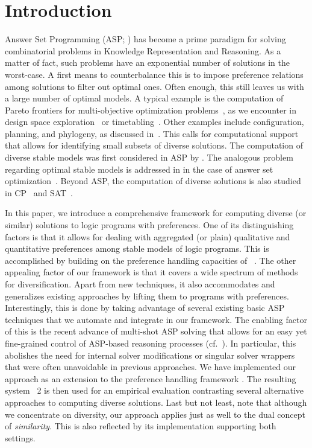 
\section{Introduction}\label{sec:introduction}
 
Answer Set Programming (ASP; \cite{baral02a}) has become a prime paradigm for solving combinatorial problems in Knowledge Representation and Reasoning. 
As a matter of fact,
such problems have an exponential number of solutions in the worst-case.
A first means to counterbalance this is to impose preference relations among solutions
to filter out optimal ones.
Often enough, this still leaves us with a large number of optimal models.
%
A typical example is the computation of Pareto frontiers for multi-objective optimization problems~\cite{pareto64a},
as we encounter in design space exploration~\cite{angeglharesc13a} or timetabling~\cite{basotainsc13a}.
%
Other examples include configuration, planning, and phylogeny, as discussed in~\cite{eiererfi13a}.
% 
This calls for computational support that allows for identifying small subsets of diverse solutions.
%
The computation of diverse stable models was first considered in ASP by \cite{eiererfi13a}.
The analogous problem regarding optimal stable models is addressed in \cite{zhutru13a} in the case of answer set optimization~\cite{brnitr03a}.
Beyond ASP, the computation of diverse solutions is also studied in CP~\cite{hehnocwa05a} and SAT~\cite{nadel11a}.

In this paper,
we introduce a comprehensive framework for computing diverse (or similar) solutions to logic programs with preferences.
One of its distinguishing factors is that it allows for dealing with aggregated (or plain) qualitative and quantitative preferences among stable models of logic programs.
This is accomplished by building on the preference handling capacities of \asprin~\cite{brderosc15a}.
The other appealing factor of our framework is that it covers a wide spectrum of methods for diversification.
Apart from new techniques, it also accommodates and generalizes existing approaches by lifting them to programs with preferences.
Interestingly, this is done by taking advantage of several existing basic ASP techniques that we automate and integrate in our framework.
The enabling factor of this is the recent advance of multi-shot ASP solving that allows for an easy yet fine-grained control of
ASP-based reasoning processes (cf.~\cite{gekakasc14b}).
In particular, this abolishes the need for internal solver modifications or singular solver wrappers that were often unavoidable in previous approaches.
We have implemented our approach as an extension to the preference handling framework \asprin.
The resulting system \asprin~2 is then used for an empirical evaluation contrasting several alternative approaches to
computing diverse solutions.
%
Last but not least,
note that although we concentrate on diversity,
our approach applies just as well to the dual concept of \emph{similarity}.
This is also reflected by its implementation supporting both settings.

